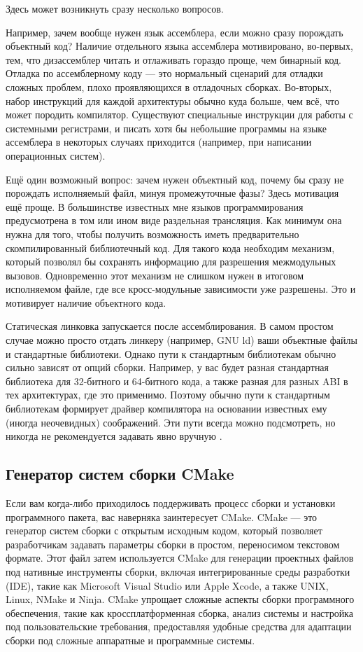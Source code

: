Здесь может возникнуть сразу несколько вопросов.

Например, зачем вообще нужен язык ассемблера, если можно сразу порождать объектный код? Наличие отдельного языка ассемблера мотивировано, во-первых, тем, что дизассемблер читать и отлаживать гораздо проще, чем бинарный код. Отладка по ассемблерному коду — это нормальный сценарий для отладки сложных проблем, плохо проявляющихся в отладочных сборках. Во-вторых, набор инструкций для каждой архитектуры обычно куда больше, чем всё, что может породить компилятор. Существуют специальные инструкции для работы с системными регистрами, и писать хотя бы небольшие программы на языке ассемблера в некоторых случаях приходится (например, при написании операционных систем).

Ещё один возможный вопрос: зачем нужен объектный код, почему бы сразу не порождать исполняемый файл, минуя промежуточные фазы? Здесь мотивация ещё проще. В большинстве известных мне языков программирования предусмотрена в том или ином виде раздельная трансляция. Как минимум она нужна для того, чтобы получить возможность иметь предварительно скомпилированный библиотечный код. Для такого кода необходим механизм, который позволял бы сохранять информацию для разрешения межмодульных вызовов. Одновременно этот механизм не слишком нужен в итоговом исполняемом файле, где все кросс-модульные зависимости уже разрешены. Это и мотивирует наличие объектного кода.

Статическая линковка запускается после ассемблирования. В самом простом случае можно просто отдать линкеру (например, GNU ld) ваши объектные файлы и стандартные библиотеки. Однако пути к стандартным библиотекам обычно сильно зависят от опций сборки. Например, у вас будет разная стандартная библиотека для 32-битного и 64-битного кода, а также разная для разных ABI в тех архитектурах, где это применимо. Поэтому обычно пути к стандартным библиотекам формирует драйвер компилятора на основании известных ему (иногда неочевидных) соображений. Эти пути всегда можно подсмотреть, но никогда не рекомендуется задавать явно вручную \cite{Vladimirov2024}.

\subsection{Генератор систем сборки CMake}

Если вам когда-либо приходилось поддерживать процесс сборки и установки программного пакета, вас наверняка заинтересует CMake. CMake — это генератор систем сборки с открытым исходным кодом, который позволяет разработчикам задавать параметры сборки в простом, переносимом текстовом формате. Этот файл затем используется CMake для генерации проектных файлов под нативные инструменты сборки, включая интегрированные среды разработки (IDE), такие как Microsoft Visual Studio или Apple Xcode, а также UNIX, Linux, NMake и Ninja. CMake упрощает сложные аспекты сборки программного обеспечения, такие как кроссплатформенная сборка, анализ системы и настройка под пользовательские требования, предоставляя удобные средства для адаптации сборки под сложные аппаратные и программные системы.

